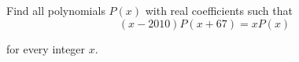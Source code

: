 Find all polynomials $P(x)$ with real coefficients such that\[(x-2010)P(x+67)=xP(x) \]

for every integer $x$.